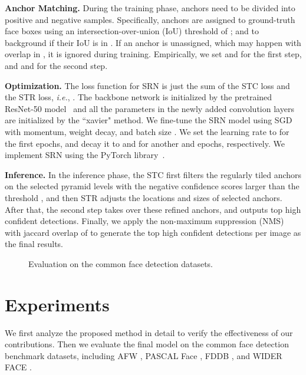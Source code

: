 \documentclass[letterpaper]{article} \usepackage{aaai19m}  \usepackage{times}  \usepackage{helvet}  \usepackage{courier}  \usepackage{url}  \usepackage{graphicx}  \usepackage{subfigure}
\def\ie{{\em i.e.}}
\begin{document}
{\noindent \textbf{Anchor Matching.} }
During the training phase, anchors need to be divided into positive and negative samples. Specifically, anchors are assigned to ground-truth face boxes using an intersection-over-union (IoU) threshold of ; and to background if their IoU is in . If an anchor is unassigned, which may happen with overlap in , it is ignored during training. Empirically, we set  and  for the first step, and  and  for the second step. 

{\flushleft \textbf{Optimization.} }
The loss function for SRN is just the sum of the STC loss and the STR loss, \ie, . The backbone network is initialized by the pretrained ResNet-50 model~\cite{DBLP:journals/ijcv/RussakovskyDSKS15} and all the parameters in the newly added convolution layers are initialized by the ``xavier" method. We fine-tune the SRN model using SGD with  momentum,  weight decay, and batch size . We set the learning rate to  for the first  epochs, and decay it to  and  for another  and  epochs, respectively. We implement SRN using the PyTorch library~\cite{paszke2017pytorch}.

{\flushleft \textbf{Inference.} }
In the inference phase, the STC first filters  the regularly tiled anchors on the selected pyramid levels with the negative confidence scores larger than the threshold , and then STR adjusts the locations and sizes of selected anchors. After that, the second step takes over these refined anchors, and outputs top  high confident detections. Finally, we apply the non-maximum suppression (NMS) with jaccard overlap of  to generate the top  high confident detections per image as the final results.

\begin{figure*}[t]
\centering
{}
\caption{Evaluation on the common face detection datasets.}
\label{fig:evaluation}
\end{figure*}

\section{Experiments}

We first analyze the proposed method in detail to verify the effectiveness of our contributions. Then we evaluate the final model on the common face detection benchmark datasets, including AFW \cite{DBLP:conf/cvpr/ZhuR12}, PASCAL Face \cite{DBLP:journals/ivc/YanZLL14}, FDDB \cite{fddbTech}, and WIDER FACE \cite{DBLP:conf/cvpr/YangLLT16}.
\end{document}

